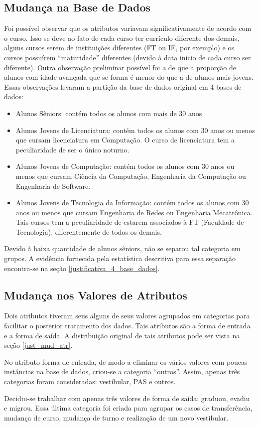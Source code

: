 \subsection{Mudança na Base de Dados}
\par Foi possível observar que os atributos variavam significativamente de acordo com
o curso. Isso se deve ao fato de cada curso ter currículo diferente dos
demais, alguns cursos serem de instituições diferentes (FT ou IE, por exemplo) e os
cursos possuírem ``maturidade'' diferentes (devido à data início de cada curso ser
diferente). Outra observação preliminar possível foi a de que a proporção de alunos
com idade avançada que se forma é menor do que a de alunos mais jovens. Essas
observações levaram a partição da base de dados original em 4 bases de dados: 
\begin{itemize}[itemsep=3ex]
    \item Alunos Sêniors: contém todos os alunos com mais de 30 anos
    \item Alunos Jovens de Licenciatura: contém todos os alunos com 30 anos ou menos
        que cursam licenciatura em Computação. O curso de licenciatura tem a
        peculiaridade de ser o único noturno. 
    \item Alunos Jovens de Computação: contém todos os alunos com 30 anos ou menos
        que cursam Ciência da Computação, Engenharia da Computação ou Engenharia de
        Software. 
    \item Alunos Jovens de Tecnologia da Informação: contém todos os alunos com 30
        anos ou menos que cursam Engenharia de Redes ou Engenharia Mecatrônica. Tais
        cursos tem a peculiaridade de estarem associados à FT (Faculdade de
        Tecnologia), diferentemente de todos os demais.  
\end{itemize}
Devido à baixa quantidade de alunos sêniors, não se separou tal categoria em grupos.
A evidência fornecida pela estatística descritiva para essa separação
encontra-se na seção \ref{justificativa_4_base_dados}.

\subsection{Mudança nos Valores de Atributos}
\par Dois atributos tiveram seus alguns de seus valores agrupados em categorias para
facilitar o posterior tratamento dos dados. Tais atributos são a forma de entrada e a
forma de saída. A distribuição original de tais atributos pode ser vista na seção 
\ref{just_mud_atr}. 
\par No atributo forma de entrada, de modo a eliminar os vários valores com poucas
instâncias na base de dados, criou-se a categoria ``outros''. Assim, apenas três 
categorias foram consideradas: vestibular, PAS e outros. 
\par Decidiu-se trabalhar com apenas três valores de forma de saída: graduou, evadiu
e migrou. Essa última categoria foi criada para agrupar os casos de transferência,
mudança de curso, mudança de turno e realização de um novo vestibular. 

